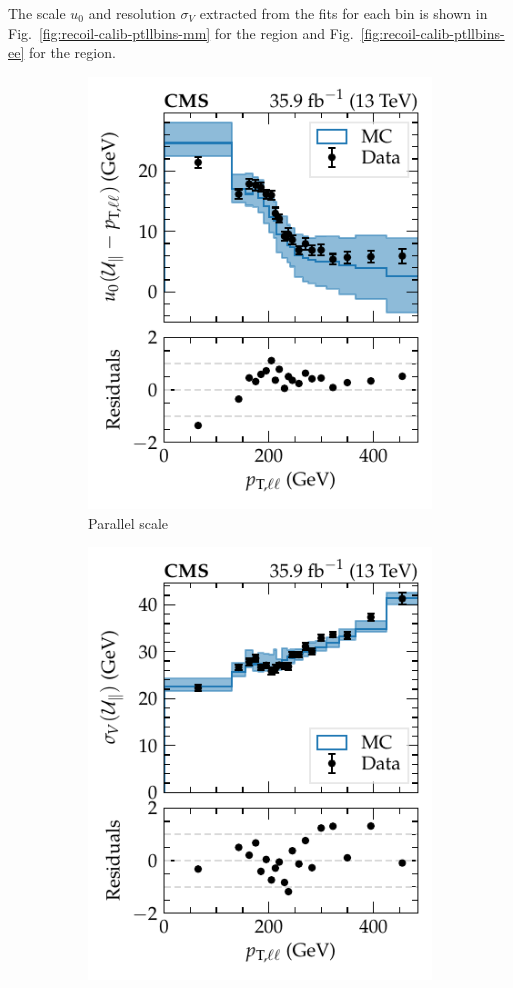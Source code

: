 The scale $u_0$ and resolution $\sigma_V$ extracted from the fits for each
\ptll bin is shown in Fig.~\ref{fig:recoil-calib-ptllbins-mm} for the
\dimuplusjets region and Fig.~\ref{fig:recoil-calib-ptllbins-ee} for the
\dieleplusjets region.
%
\begin{figure}[htb]
    \centering
    \begin{subfigure}[b]{0.49\textwidth}
        \centering
        \includegraphics{chapters/041_corrections/images/ptmiss_calib/metres_mm_u0_para.pdf}
        \caption{Parallel scale}
        \label{subfiga:recoil-calib-ptllbins-mm}
    \end{subfigure}
    \hfill
    \begin{subfigure}[b]{0.49\textwidth}
        \centering
        \includegraphics{chapters/041_corrections/images/ptmiss_calib/metres_mm_sigmav_para.pdf}

\end{subfigure}
\end{figure}
